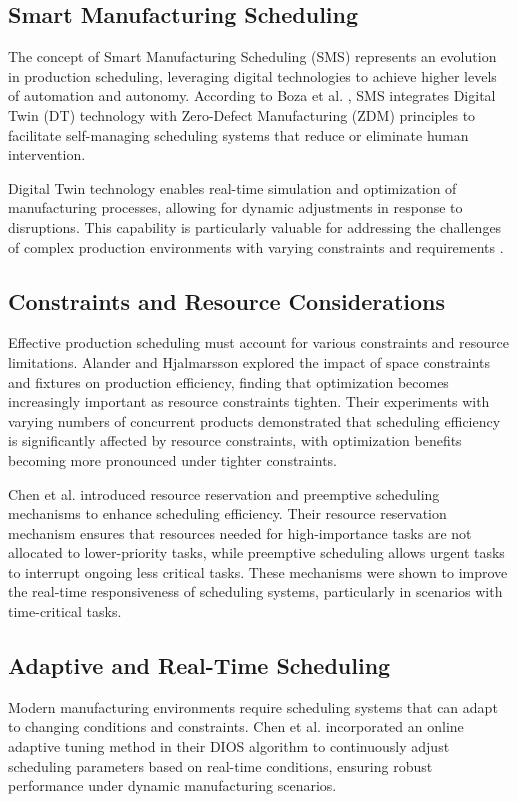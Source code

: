 \subsection{Smart Manufacturing Scheduling}

The concept of Smart Manufacturing Scheduling (SMS) represents an evolution in production scheduling, leveraging digital technologies to achieve higher levels of automation and autonomy. According to Boza et al. \cite{serranoruiz2023}, SMS integrates Digital Twin (DT) technology with Zero-Defect Manufacturing (ZDM) principles to facilitate self-managing scheduling systems that reduce or eliminate human intervention.

Digital Twin technology enables real-time simulation and optimization of manufacturing processes, allowing for dynamic adjustments in response to disruptions. This capability is particularly valuable for addressing the challenges of complex production environments with varying constraints and requirements \cite{serranoruiz2023}.

\subsection{Constraints and Resource Considerations}

Effective production scheduling must account for various constraints and resource limitations. Alander and Hjalmarsson \cite{alander2024} explored the impact of space constraints and fixtures on production efficiency, finding that optimization becomes increasingly important as resource constraints tighten. Their experiments with varying numbers of concurrent products demonstrated that scheduling efficiency is significantly affected by resource constraints, with optimization benefits becoming more pronounced under tighter constraints.

Chen et al. \cite{chen2023} introduced resource reservation and preemptive scheduling mechanisms to enhance scheduling efficiency. Their resource reservation mechanism ensures that resources needed for high-importance tasks are not allocated to lower-priority tasks, while preemptive scheduling allows urgent tasks to interrupt ongoing less critical tasks. These mechanisms were shown to improve the real-time responsiveness of scheduling systems, particularly in scenarios with time-critical tasks.

\subsection{Adaptive and Real-Time Scheduling}

Modern manufacturing environments require scheduling systems that can adapt to changing conditions and constraints. Chen et al. \cite{chen2023} incorporated an online adaptive tuning method in their DIOS algorithm to continuously adjust scheduling parameters based on real-time conditions, ensuring robust performance under dynamic manufacturing scenarios.